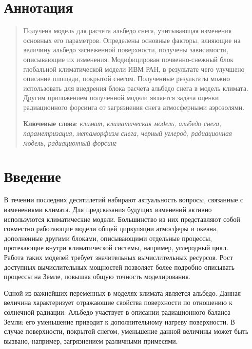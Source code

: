 \documentclass[a4paper, fontsize=14pt]{scrartcl}
\begin{document}
\author{Черненков Алексей Юрьевич}

\section*{Аннотация}
\begin{abstract}

Получена модель для расчета альбедо снега, учитывающая изменения основных его параметров. Определены основные факторы, влияющие на величину альбедо заснеженной поверхности, получены зависимости, описывающие их изменения. Модифицирован почвенно-снежный блок глобальной климатической модели ИВМ РАН, в результате чего улучшено описание площади, покрытой снегом. Полученные результаты можно использовать для внедрения блока расчета альбедо снега в модель климата. Другим приложением полученной модели является задача оценки радиационного форсинга от загрязнения снега атмосферными аэрозолями. 
  
  \bigskip
  \textbf{Ключевые слова}: \emph{климат, климатическая модель, альбедо снега, параметризация, метаморфизм снега, черный углерод, радиационная модель, радиационный форсинг}
\end{abstract}


\newpage
{}
{}
\tableofcontents


\newpage
\section*{Введение}

В течении последних десятилетий набирают актуальность вопросы, связанные с изменениями климата. Для предсказания будущих изменений активно используются климатические модели. Большинство из них представляют собой совместно работающие модели общей циркуляции атмосферы и океана, дополненные другими блоками, описывающими отдельные процессы, протекающие внутри климатической системы, например, углеродный цикл. Работа таких моделей требует значительных вычислительных ресурсов. Рост доступных вычислительных мощностей позволяет более подробно описывать процессы на Земле, повышая общую точность моделирования. 

Одной из важнейших переменных в моделях климата является альбедо. Данная величина характеризует отражающие свойства поверхности по отношению к солнечной радиации. Альбедо участвует в описании радиационного баланса Земли: его уменьшение приводит к дополнительному нагреву поверхности. В случае поверхности, покрытой снегом, уменьшение данной величины может быть вызвано, например, загрязнением различными примесями.
\end{document}

